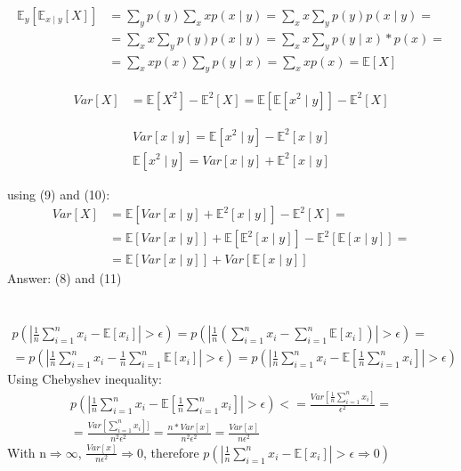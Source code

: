 \documentclass[11pt]{article}
\newcommand{\exercise}{\section{}}
\begin{document}
\begin{equation}
\begin{split}
\mathbb{E}_{y}[\mathbb{E}_{x\mid y}[X]] &= \sum_{y}p(y)\sum_{x}xp(x\mid y) = \sum_{x}x\sum_{y}p(y)p(x\mid y)=\\
&= \sum_{x}x\sum_{y}p(y)p(x\mid y)= \sum_{x}x\sum_{y}p(y\mid x)*p(x) =\\
&= \sum_{x}xp(x)\sum_{y}p(y\mid x) = \sum_{x}xp(x) = \mathbb{E}[X] 
\end{split}
\end{equation}

\begin{equation}
\begin{split}
Var[X] &= \mathbb{E}[X^2] - \mathbb{E}^2[X] = \mathbb{E}[\mathbb{E}[x^2\mid y]]- \mathbb{E}^2[X]
\end{split}
\end{equation}

\begin{equation}
\begin{split}
Var[x\mid y] = \mathbb{E}[x^2\mid y] -\mathbb{E}^2[x\mid y]\\
 \mathbb{E}[x^2\mid y] = Var[x\mid y] + \mathbb{E}^2[x\mid y]
\end{split}
\end{equation}

using (9) and (10):
\begin{equation}
\begin{split}
Var[X] &= \mathbb{E}[Var[x\mid y] + \mathbb{E}^2[x\mid y]]- \mathbb{E}^2[X]=\\
&=\mathbb{E}[Var[x\mid y]]+\mathbb{E}[\mathbb{E}^2[x\mid y]]-\mathbb{E}^2[\mathbb{E}[x\mid y]]=\\
&= \mathbb{E}[Var[x\mid y]]+Var[\mathbb{E}[x\mid y]]
\end{split}
\end{equation}
Answer: (8) and (11)


\exercise
\begin{equation}
\begin{split}
p(\left|\frac{1}{n}\sum_{i=1}^{n}x_{i}-\mathbb{E}[x_{i}]  \right|>\epsilon)= p(\left|\frac{1}{n}(\sum_{i=1}^{n}x_{i}-\sum_{i=1}^{n}\mathbb{E}[x_{i}]) \right|>\epsilon)=\\
=p(\left|\frac{1}{n}\sum_{i=1}^{n}x_{i}-\frac{1}{n}\sum_{i=1}^{n}\mathbb{E}[x_{i}]  \right|>\epsilon)= p(\left|\frac{1}{n}\sum_{i=1}^{n}x_{i}-\mathbb{E}[\frac{1}{n}\sum_{i=1}^{n}x_{i}]  \right|>\epsilon)
\end{split}
\end{equation}
Using Chebyshev inequality:
\begin{equation}
\begin{split}
p(\left|\frac{1}{n}\sum_{i=1}^{n}x_{i}-\mathbb{E}[\frac{1}{n}\sum_{i=1}^{n}x_{i}]  \right|>\epsilon)<=\frac{Var[\frac{1}{n}\sum_{i=1}^{n}x_{i}]}{\epsilon^2} = \\
=\frac{Var[\sum_{i=1}^{n}x_{i}]]}{n^2\epsilon^2}=\frac{n*Var[x]}{n^2\epsilon^2}=\frac{Var[x]}{n\epsilon^2}
\end{split}
\end{equation}
With n$\Rightarrow\infty$, $\frac{Var[x]}{n\epsilon^2}\Rightarrow 0$, therefore $p(\left|\frac{1}{n}\sum_{i=1}^{n}x_{i}-\mathbb{E}[x_{i}]  \right|>\epsilon\Rightarrow 0)$
\end{document}
